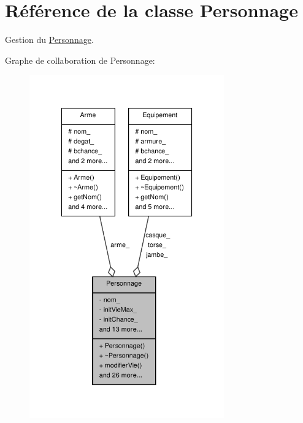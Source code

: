 \hypertarget{class_personnage}{\section{Référence de la classe Personnage}
\label{class_personnage}
}


Gestion du \hyperlink{class_personnage}{Personnage}.  




Graphe de collaboration de Personnage\-:
\nopagebreak
\begin{figure}[H]
\begin{center}
\leavevmode
\includegraphics[width=238pt]{class_personnage__coll__graph}
\end{center}
\end{figure}
